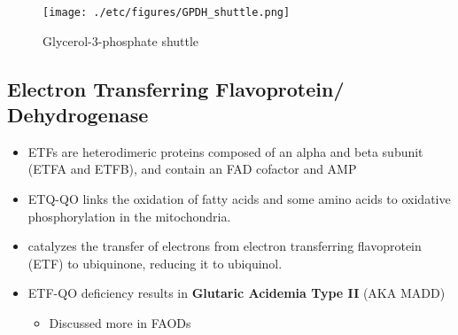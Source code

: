 \documentclass{scrartcl}
\begin{document}
\begin{figure}[htbp]
\centering
\texttt{[image: ./etc/figures/GPDH\_shuttle.png]}
\caption[g3ps]{\label{fig:org10827d6}
Glycerol-3-phosphate shuttle}
\end{figure}

\subsection{Electron Transferring Flavoprotein/ Dehydrogenase}
\label{sec:orgc9917ff}

\begin{itemize}
\item ETFs are heterodimeric proteins composed of an alpha and beta
subunit (ETFA and ETFB), and contain an FAD cofactor and AMP

\item ETQ-QO links the oxidation of fatty acids and some amino acids to
oxidative phosphorylation in the mitochondria.
\item catalyzes the transfer of electrons from electron transferring
flavoprotein (ETF) to ubiquinone, reducing it to ubiquinol.
\end{itemize}

{\small{}}

\begin{itemize}
\item ETF-QO deficiency results in \textbf{Glutaric Acidemia Type II} (AKA MADD)
\begin{itemize}
\item Discussed more in FAODs
\end{itemize}
\end{itemize}
\end{document}

